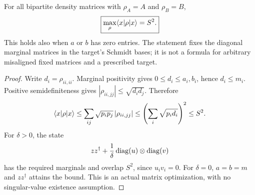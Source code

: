 \begin{theorem}\label{thm:fixed-matrix}
For all bipartite density matrices with $\rho_A=A$ and $\rho_B=B$,
\[
 \boxed{\max_\rho\langle x\rvert\rho\lvert x\rangle=S^2.}
\]
This holds also when $a$ or $b$ has zero entries. The statement fixes the diagonal marginal matrices in the target's Schmidt bases; it is not a formula for arbitrary misaligned fixed matrices and a prescribed target.
\end{theorem}
\begin{proof}
Write $d_i=\rho_{ii,ii}$. Marginal positivity gives $0\le d_i\le a_i,b_i$, hence $d_i\le m_i$. Positive semidefiniteness gives $|\rho_{ii,jj}|\le\sqrt{d_i d_j}$. Therefore
\[
 \langle x\rvert\rho\lvert x\rangle
 \le\sum_{ij}\sqrt{p_i p_j}\,|\rho_{ii,jj}|
 \le\left(\sum_i\sqrt{p_i d_i}\right)^2
 \le S^2.
\]
For $\delta>0$, the state
\[
 zz^\dagger+\frac1\delta\operatorname{diag}(u)\otimes\operatorname{diag}(v)
\]
has the required marginals and overlap $S^2$, since $u_i v_i=0$. For $\delta=0$, $a=b=m$ and $zz^\dagger$ attains the bound. This is an actual matrix optimization, with no singular-value existence assumption.
\end{proof}

